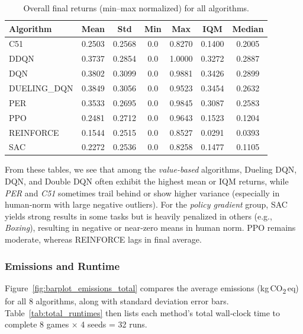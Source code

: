 \begin{table} 
	\centering
	\caption{Overall final returns (min--max normalized) for all algorithms.}
	\label{tab:all_algo_eval_minmax}
	\begin{tabular}{lcccccc}
		\toprule
		\textbf{Algorithm} & \textbf{Mean} & \textbf{Std} & \textbf{Min} & \textbf{Max} & \textbf{IQM} & \textbf{Median} \\
		\midrule
		C51       & 0.2503 & 0.2568 & 0.0 & 0.8270 & 0.1400 & 0.2005 \\
		DDQN      & 0.3737 & 0.2854 & 0.0 & 1.0000 & 0.3272 & 0.2887 \\
		DQN       & 0.3802 & 0.3099 & 0.0 & 0.9881 & 0.3426 & 0.2899 \\
		DUELING\_DQN & 0.3849 & 0.3056 & 0.0 & 0.9523 & 0.3454 & 0.2632 \\
		PER       & 0.3533 & 0.2695 & 0.0 & 0.9845 & 0.3087 & 0.2583 \\
		PPO       & 0.2481 & 0.2712 & 0.0 & 0.9643 & 0.1523 & 0.1204 \\
		REINFORCE & 0.1544 & 0.2515 & 0.0 & 0.8527 & 0.0291 & 0.0393 \\
		SAC       & 0.2272 & 0.2536 & 0.0 & 0.8258 & 0.1477 & 0.1105 \\
		\bottomrule
	\end{tabular}
\end{table}

From these tables, we see that among the \emph{value-based} algorithms, 
Dueling DQN, DQN, and Double DQN often exhibit the highest mean or IQM returns, while 
\emph{PER} and \emph{C51} sometimes trail behind or show higher variance (especially in 
human‐norm with large negative outliers). For the \emph{policy gradient} group, SAC yields strong 
results in some tasks but is heavily penalized in others (e.g., \emph{Boxing}), resulting 
in negative or near‐zero means in human norm. PPO remains moderate, whereas REINFORCE 
lags in final average.

\subsubsection{Emissions and Runtime}

Figure~\ref{fig:barplot_emissions_total} compares the average emissions (kg\,CO\textsubscript{2}\,eq) for 
all 8 algorithms, along with standard deviation error bars. Table~\ref{tab:total_runtimes} 
then lists each method's total wall‐clock time to complete 8 games × 4 seeds = 32 runs.

